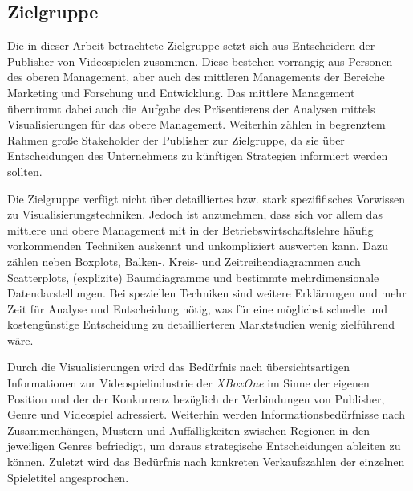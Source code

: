 \documentclass[usegeometry=true]{scrartcl}
\begin{document}
\subsection{Zielgruppe}
Die in dieser Arbeit betrachtete Zielgruppe setzt sich aus Entscheidern der Publisher von Videospielen zusammen. 
Diese bestehen vorrangig aus Personen des oberen Management, aber auch des mittleren Managements der Bereiche Marketing und Forschung und Entwicklung. 
Das mittlere Management übernimmt dabei auch die Aufgabe des Präsentierens der Analysen mittels Visualisierungen für das obere Management.
Weiterhin zählen in begrenztem Rahmen große Stakeholder der Publisher zur Zielgruppe, 
da sie über Entscheidungen des Unternehmens zu künftigen Strategien informiert werden sollten. 

Die Zielgruppe verfügt nicht über detailliertes bzw. stark spezififisches Vorwissen zu Visualisierungstechniken. 
Jedoch ist anzunehmen, dass sich vor allem das mittlere und obere Management mit in der Betriebswirtschaftslehre häufig vorkommenden Techniken auskennt und unkompliziert auswerten kann.
Dazu zählen neben Boxplots, Balken-, Kreis- und Zeitreihendiagrammen auch Scatterplots, (explizite) Baumdiagramme und bestimmte mehrdimensionale Datendarstellungen. 
Bei speziellen Techniken sind weitere Erklärungen und mehr Zeit für Analyse und Entscheidung nötig,
was für eine möglichst schnelle und kostengünstige Entscheidung zu detaillierteren Marktstudien wenig zielführend wäre.

Durch die Visualisierungen wird das Bedürfnis nach übersichtsartigen Informationen zur Videospielindustrie der \textit{XBoxOne}
im Sinne der eigenen Position und der der Konkurrenz bezüglich der Verbindungen von Publisher, Genre und Videospiel adressiert.
Weiterhin werden Informationsbedürfnisse nach Zusammenhängen, Mustern und Auffälligkeiten zwischen Regionen in den jeweiligen Genres befriedigt, 
um daraus strategische Entscheidungen ableiten zu können.
Zuletzt wird das Bedürfnis nach konkreten Verkaufszahlen der einzelnen Spieletitel angesprochen.
\end{document}
